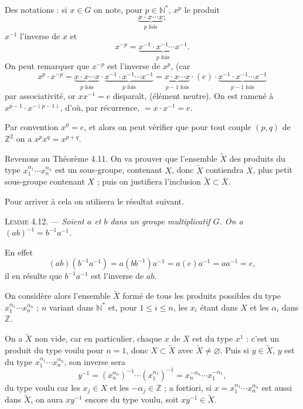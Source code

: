Des notations : si $x\in G$ on note, pour $p\in\mathbb N^*$, $x^p$ le produit
\[
\underbrace{x\cdot x\cdots x}_{p\text{ fois}};
\]
$x^{-1}$ l'inverse de $x$ et
\[
x^{-p}=\underbrace{x^{-1}\cdot x^{-1}\cdots x^{-1}}_{p\text{ fois}}.
\]
On peut remarquer que $x^{-p}$ est l'inverse de $x^p$, (car
\[
x^p\cdot x^{-p}
=\underbrace{x\cdot x\cdots x}_{p\text{ fois}}\cdot
\underbrace{x^{-1}\cdot x^{-1}\cdots x^{-1}}_{p\text{ fois}}
=\underbrace{x\cdot x\cdots x}_{p-1\text{ fois}}\cdot(e)\cdot
\underbrace{x^{-1}\cdot x^{-1}\cdots x^{-1}}_{p-1\text{ fois}}
\]
par associativité, or $xx^{-1}=e$ disparaît, (élément neutre). On est ramené à $x^{p-1}\cdot x^{-(p-1)}$, d'où, par récurrence, $=x\cdot x^{-1}=e$.

Par convention $x^0=e$, et alors on peut vérifier que pour tout couple $(p,q)$ de $\mathbb Z^2$ on a $x^px^q=x^{p+q}$.

Revenons au Théorème 4.11. On va prouver que l'ensemble $\widetilde X$ des produits du type $x_1^{\alpha_1}\cdots x_n^{\alpha_n}$ est un sous-groupe, contenant $X$, donc $\widetilde X$ contiendra $\overline X$, plus petit sous-groupe contenant $X$ ; puis on justifiera l'inclusion $\widetilde X\subset\overline X$.

Pour arriver à cela on utilisera le résultat suivant.

\medskip\noindent\textsc{Lemme 4.12.} --- \emph{Soient $a$ et $b$ dans un groupe multiplicatif $G$. On a $(ab)^{-1}=b^{-1}a^{-1}$.}

En effet
\[
(ab)(b^{-1}a^{-1})=a(bb^{-1})a^{-1}=a(e)a^{-1}=aa^{-1}=e,
\]
il en résulte que $b^{-1}a^{-1}$ est l'inverse de $ab$. \bookend

On considère alors l'ensemble $\widetilde X$ formé de tous les produits possibles du type $x_1^{\alpha_1}\cdots x_n^{\alpha_n}$ ; $n$ variant dans $\mathbb N^*$ et, pour $1\le i\le n$, les $x_i$ étant dans $X$ et les $\alpha_i$ dans $\mathbb Z$.

On a $\widetilde X$ non vide, car en particulier, chaque $x$ de $X$ est du type $x^1$ : c'est un produit du type voulu pour $n=1$, donc $X\subset\widetilde X$ avec $\widetilde X\ne\varnothing$. Puis si $y\in\widetilde X$, $y$ est du type $x_1^{\alpha_1}\cdots x_n^{\alpha_n}$, son inverse sera
\[
y^{-1}=(x_n^{\alpha_n})^{-1}\cdots(x_1^{\alpha_1})^{-1}
=x_n^{-\alpha_n}\cdots x_1^{-\alpha_1},
\]
du type voulu car les $x_j\in X$ et les $-\alpha_j\in\mathbb Z$ ; a fortiori, si $x=x_1^{\alpha_1}\cdots x_n^{\alpha_n}$ est aussi dans $\widetilde X$, on aura $xy^{-1}$ encore du type voulu, soit $xy^{-1}\in\widetilde X$.

